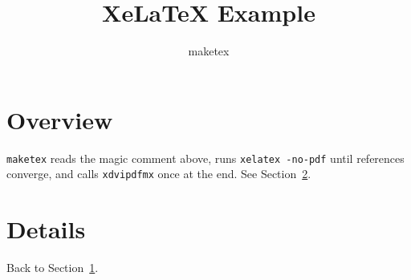 \documentclass{article}
\title{XeLaTeX Example}
\author{maketex}
\begin{document}
\maketitle
\tableofcontents

\section{Overview}\label{sec:overview}
\texttt{maketex} reads the magic comment above, runs \texttt{xelatex -no-pdf}
until references converge, and calls \texttt{xdvipdfmx} once at the end.
See Section~\ref{sec:details}.

\section{Details}\label{sec:details}
Back to Section~\ref{sec:overview}.
\end{document}
